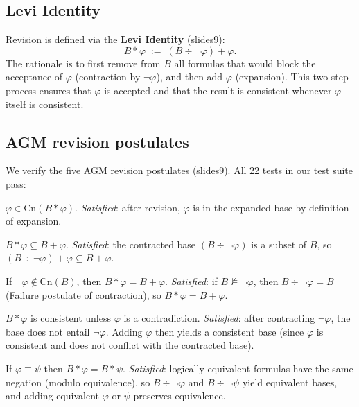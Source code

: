 \documentclass[11pt,a4paper]{article}
\newcommand{\Cn}{\mathrm{Cn}}
\newcommand{\nentails}{\not\models}
\newcommand{\contraction}{\mathbin{\div}}
\newcommand{\revision}{\mathbin{*}}
\newcommand{\expansion}{\mathbin{+}}
\newcommand{\lneg}{\neg}
\begin{document}
\subsection{Levi Identity}

Revision is defined via the \textbf{Levi Identity} (slides9):
\[
  B \revision \varphi \;:=\; (B \contraction \lneg\varphi) \expansion \varphi.
\]
The rationale is to first remove from $B$ all formulas that would block the
acceptance of $\varphi$ (contraction by $\lneg\varphi$), and then add $\varphi$
(expansion).  This two-step process ensures that $\varphi$ is accepted
and that the result is consistent whenever $\varphi$ itself is consistent.

\subsection{AGM revision postulates}

We verify the five AGM revision postulates (slides9).
All 22 tests in our test suite pass:

\begin{description}[noitemsep]
  \item[(R1) Success] $\varphi \in \Cn(B \revision \varphi)$.
  \textit{Satisfied}: after revision, $\varphi$ is in the expanded base by
  definition of expansion.

  \item[(R2) Inclusion] $B \revision \varphi \subseteq B \expansion \varphi$.
  \textit{Satisfied}: the contracted base $(B \contraction \lneg\varphi)$ is
  a subset of $B$, so $(B \contraction \lneg\varphi) \expansion \varphi
  \subseteq B \expansion \varphi$.

  \item[(R3) Vacuity] If $\lneg\varphi \notin \Cn(B)$, then
  $B \revision \varphi = B \expansion \varphi$.
  \textit{Satisfied}: if $B \nentails \lneg\varphi$, then
  $B \contraction \lneg\varphi = B$ (Failure postulate of contraction),
  so $B \revision \varphi = B \expansion \varphi$.

  \item[(R4) Consistency] $B \revision \varphi$ is consistent unless $\varphi$
  is a contradiction.
  \textit{Satisfied}: after contracting $\lneg\varphi$, the base does not
  entail $\lneg\varphi$.  Adding $\varphi$ then yields a consistent base
  (since $\varphi$ is consistent and does not conflict with the contracted base).

  \item[(R5) Extensionality] If $\varphi \equiv \psi$ then
  $B \revision \varphi = B \revision \psi$.
  \textit{Satisfied}: logically equivalent formulas have the same negation
  (modulo equivalence), so $B \contraction \lneg\varphi$ and
  $B \contraction \lneg\psi$ yield equivalent bases, and adding equivalent
  $\varphi$ or $\psi$ preserves equivalence.
\end{description}
\end{document}
